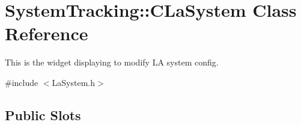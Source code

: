 \hypertarget{classSystemTracking_1_1CLaSystem}{\section{\-System\-Tracking\-:\-:\-C\-La\-System \-Class \-Reference}
\label{classSystemTracking_1_1CLaSystem}
}


\-This is the widget displaying to modify \-L\-A system config.  




{\ttfamily \#include $<$\-La\-System.\-h$>$}

\subsection*{\-Public \-Slots}
